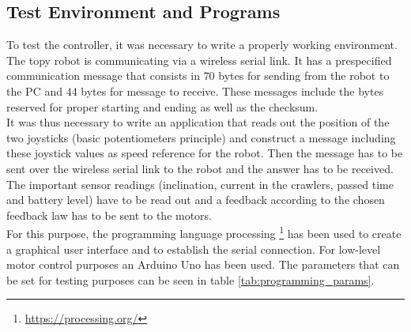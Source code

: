 	
	\subsection{Test Environment and Programs}
	To test the controller, it was necessary to write a properly working environment. The topy robot is communicating via a wireless serial link. It has a prespecified communication message that consists in $70$ bytes for sending from the robot to the PC and $44$ bytes for message to receive. These messages include the bytes reserved for proper starting and ending as well as the checksum. \\
	It was thus necessary to write an application that reads out the position of the two joysticks (basic potentiometers principle) and construct a message including these joystick values as speed reference for the robot. Then the message has to be sent over the wireless serial link to the robot and the answer has to be received. The important sensor readings (inclination, current in the crawlers, passed time and battery level) have to be read out and a feedback according to the chosen feedback law has to be sent to the motors.\\
	For this purpose, the programming language processing \footnote{\url{https://processing.org/}} has been used to create a graphical user interface and to establish the serial connection. For low-level motor control purposes an Arduino Uno has been used. The parameters that can be set for testing purposes can be seen in table \ref{tab:programming_params}.
	
